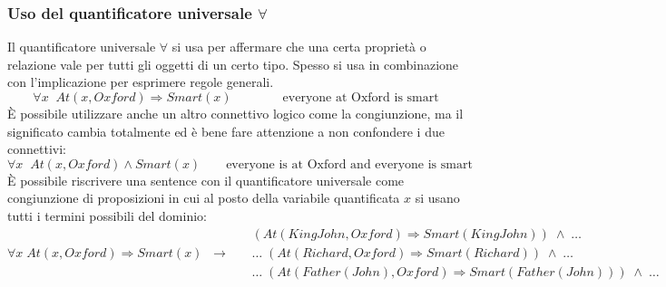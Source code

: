 \subsubsection*{Uso del quantificatore universale \(\forall\)}
Il quantificatore universale \(\forall\) si usa per affermare che una certa proprietà o relazione vale per tutti
gli oggetti di un certo tipo. Spesso si usa in combinazione con l'implicazione per esprimere regole generali.
\[\forall x \;\; At(x, Oxford) \Rightarrow Smart(x) \qquad\qquad \text{everyone at Oxford is smart}\]
È possibile utilizzare anche un altro connettivo logico come la congiunzione, ma il significato cambia totalmente
ed è bene fare attenzione a non confondere i due connettivi:
\[\forall x \;\; At(x, Oxford) \land Smart(x) \quad\quad \text{everyone is at Oxford and everyone is smart}\]
È possibile riscrivere una sentence con il quantificatore universale come congiunzione di proposizioni in cui al posto
della variabile quantificata \(x\) si usano tutti i termini possibili del dominio:
\[\forall x \; At(x, Oxford) \Rightarrow Smart(x) \;\; \rightarrow \;\;
\begin{aligned}
	&(At(KingJohn, Oxford) \Rightarrow Smart(KingJohn)) \; \land \; \dots \\
	&\dots \; (At(Richard, Oxford) \Rightarrow Smart(Richard)) \; \land \; \dots \\
	&\dots \; (At(Father(John), Oxford) \Rightarrow Smart(Father(John))) \; \land \; \dots
\end{aligned}\]

